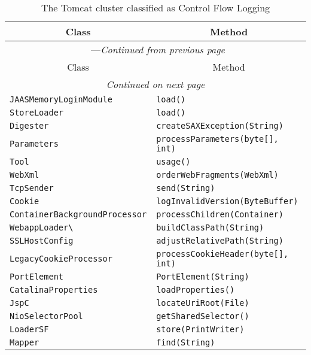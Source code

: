 \begin{center}
\begin{longtable}{ll}
\caption{The Tomcat cluster classified as Control Flow Logging}\\
\toprule\multicolumn{1}{c}{Class}&\multicolumn{1}{c}{Method}\\\midrule
\endfirsthead

\multicolumn{2}{c}{\tablename\ \thetable{}---\textit{Continued from previous page}} \\\midrule
\multicolumn{1}{c}{Class}&\multicolumn{1}{c}{Method}\\\midrule
\endhead
\multicolumn{2}{c}{\textit{Continued on next page}}\\\midrule
\endfoot
\bottomrule
\endlastfoot

\lstinline/JAASMemoryLoginModule/&{\lstinline/load()/}\\
\lstinline/StoreLoader/&{\lstinline/load()/}\\
\lstinline/Digester/&{\lstinline/createSAXException(String)/}\\
\lstinline/Parameters/&{\lstinline/processParameters(byte[], int)/}\\
\lstinline/Tool/&{\lstinline/usage()/}\\
\lstinline/WebXml/&{\lstinline/orderWebFragments(WebXml)/}\\
\lstinline/TcpSender/&{\lstinline/send(String)/}\\
\lstinline/Cookie/&{\lstinline/logInvalidVersion(ByteBuffer)/}\\
\lstinline/ContainerBackgroundProcessor/&{\lstinline/processChildren(Container)/}\\
\lstinline/WebappLoader\/&{\lstinline/buildClassPath(String)/}\\
\lstinline/SSLHostConfig/&{\lstinline/adjustRelativePath(String)/}\\
\lstinline/LegacyCookieProcessor/&{\lstinline/processCookieHeader(byte[], int)/}\\
\lstinline/PortElement/&{\lstinline/PortElement(String)/}\\
\lstinline/CatalinaProperties/&{\lstinline/loadProperties()/}\\
\lstinline/JspC/&{\lstinline/locateUriRoot(File)/}\\
\lstinline/NioSelectorPool/&{\lstinline/getSharedSelector()/}\\
\lstinline/LoaderSF/&{\lstinline/store(PrintWriter)/}\\
\lstinline/Mapper/&{\lstinline/find(String)/}\\

\end{longtable}
\end{center}
